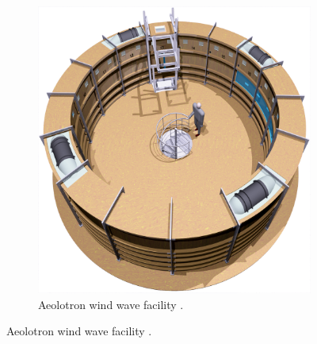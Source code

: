 		\begin{figure}[h]
			\centering
			\begin{subfigure}[t]{.3\linewidth}
				\centering
				\includegraphics[scale=0.15]{images/aeolotron-gesamt.png}
				\caption{Aeolotron wind wave facility \citep{Krall2013}.}
			\end{subfigure}
			

\end{figure}
